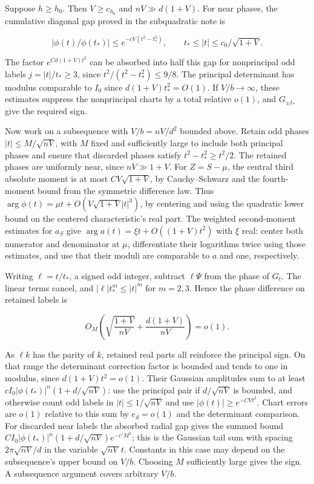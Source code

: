 Suppose $h\ge h_0$. Then $V\ge c_{h_0}$ and $nV\gg d(1+V)$. For near phases, the cumulative diagonal gap proved in the subquadratic note is

\begin{equation*}
|\phi(t)/\phi(t_*)|\le e^{-c V(t^2-t_*^2)},\qquad t_*\le |t|\le c_0/\sqrt{1+V}.
\end{equation*}

The factor $e^{Cd(1+V)t^2}$ can be absorbed into half this gap for nonprincipal odd labels $j=|t|/t_*\ge3$, since $t^2/(t^2-t_*^2)\le9/8$. The principal determinant has modulus comparable to $I_0$ since $d(1+V)t_*^2=O(1)$. If $V/b\to\infty$, these estimates suppress the nonprincipal charts by a total relative $o(1)$, and $G_{\pm t_*}$ give the required sign.

Now work on a subsequence with $V/b=nV/d^2$ bounded above. Retain odd phases $|t|\le M/\sqrt{nV}$, with $M$ fixed and sufficiently large to include both principal phases and ensure that discarded phases satisfy $t^2-t_*^2\ge t^2/2$. The retained phases are uniformly near, since $nV\gg1+V$. For $Z=S-\mu$, the central third absolute moment is at most $C V\sqrt{1+V}$, by Cauchy--Schwarz and the fourth-moment bound from the symmetric difference law. Thus $\arg\phi(t)=\mu t+O(V\sqrt{1+V}|t|^3)$, by centering and using the quadratic lower bound on the centered characteristic's real part. The weighted second-moment estimates for $a_S$ give $\arg a(t)=\xi t+O((1+V)t^2)$ with $\xi$ real: center both numerator and denominator at $\mu$, differentiate their logarithms twice using those estimates, and use that their moduli are comparable to $a$ and one, respectively.

Writing $\ell=t/t_*$, a signed odd integer, subtract $\ell\Psi$ from the phase of $G_t$. The linear terms cancel, and $|\ell|t_*^m\le |t|^m$ for $m=2,3$. Hence the phase difference on retained labels is

\begin{equation*}
O_M\!\left(\sqrt{\frac{1+V}{nV}}+\frac{d(1+V)}{nV}\right)=o(1).
\end{equation*}

As $\ell k$ has the parity of $k$, retained real parts all reinforce the principal sign. On that range the determinant correction factor is bounded and tends to one in modulus, since $d(1+V)t^2=o(1)$. Their Gaussian amplitudes sum to at least $c I_0|\phi(t_*)|^n(1+d/\sqrt{nV})$: use the principal pair if $d/\sqrt{nV}$ is bounded, and otherwise count odd labels in $|t|\le 1/\sqrt{nV}$ and use $|\phi(t)|\ge e^{-C Vt^2}$. Chart errors are $o(1)$ relative to this sum by $e_d=o(1)$ and the determinant comparison. For discarded near labels the absorbed radial gap gives the summed bound $C I_0|\phi(t_*)|^n(1+d/\sqrt{nV})e^{-c'M^2}$; this is the Gaussian tail sum with spacing $2\pi\sqrt{nV}/d$ in the variable $\sqrt{nV}\,t$. Constants in this case may depend on the subsequence's upper bound on $V/b$. Choosing $M$ sufficiently large gives the sign. A subsequence argument covers arbitrary $V/b$.


